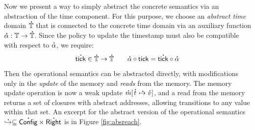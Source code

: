 \documentclass[acmsmall,screen,review]{acmart}\settopmatter{printfolios=true,printccs=false,printacmref=false}
\theoremstyle{acmdefinition}
\newcommand*{\A}[1]{\overset{\,_{\mbox{\Large .}}}{#1}}
\newcommand*{\Time}{\mathbb{T}}
\newcommand*{\mem}{m}
\newcommand*{\Config}{\mathsf{Config}}
\newcommand*{\Right}{\mathsf{Right}}
\newcommand*{\semarrow}{\hookrightarrow}
\newcommand*{\tick}{\mathsf{tick}}
\begin{document}
Now we present a way to simply abstract the concrete semantics via an abstraction of the time component.
For this purpose, we choose an \emph{abstract time} domain $\A\Time$ that is connected to the concrete time domain via an auxiliary function $\A\alpha:\Time\rightarrow\A\Time$.
Since the policy to update the timestamp must also be compatible with respect to $\A\alpha$, we require:
\[\A\tick\in\A\Time\rightarrow\A\Time\qquad\A\alpha\circ\tick=\A\tick\circ\A\alpha\]

Then the operational semantics can be abstracted directly, with modifications only in the \emph{update} of the memory and \emph{reads} from the memory.
The memory update operation is now a weak update $\A{\mem}[\A{t}\A{\mapsto}\A{v}]$,
and a read from the memory returns a set of closures with abstract addresses, allowing transitions to any value within that set.
An excerpt for the abstract version of the operational semantics $\A\semarrow\subseteq\A{\Config}\times\A{\Right}$ is in Figure \ref{fig:absreach}.
\end{document}
